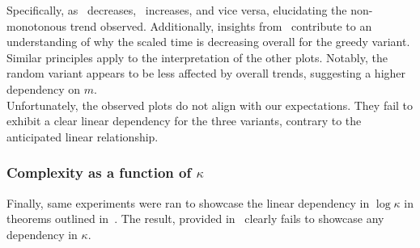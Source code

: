Specifically, as~ decreases,~ increases, and vice versa, elucidating the non-monotonous trend observed. Additionally, insights from~ contribute to an understanding of why the scaled time is decreasing overall for the greedy variant. Similar principles apply to the interpretation of the other plots. Notably, the random variant appears to be less affected by overall trends, suggesting a higher dependency on \(m\).\\

Unfortunately, the observed plots do not align with our expectations. They fail to exhibit a clear linear dependency for the three variants, contrary to the anticipated linear relationship.

\subsubsection{Complexity as a function of \(\kappa\)}

Finally, same experiments were ran to showcase the linear dependency in \(\log\kappa\) in theorems outlined in~. The result, provided in~ clearly fails to showcase any dependency in \(\kappa\).

